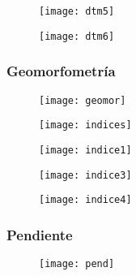 \documentclass[14pt]{beamer}
\begin{document}
\begin{frame}
  \begin{figure}
    \centering
    \texttt{[image: dtm5]}
  \end{figure}
\end{frame}
\begin{frame}
  \begin{figure}
    \centering
    \texttt{[image: dtm6]}
  \end{figure}
\end{frame}
\begin{frame}
\frametitle{Geomorfometría}
  \begin{figure}
    \centering
    \texttt{[image: geomor]}
  \end{figure}
\end{frame}
\begin{frame}
  \begin{figure}
    \centering
    \texttt{[image: indices]}
  \end{figure}
\end{frame}
\begin{frame}
  \begin{figure}
    \centering
    \texttt{[image: indice1]}
  \end{figure}
\end{frame}
\begin{frame}
  \begin{figure}
    \centering
    \texttt{[image: indice3]}
  \end{figure}
\end{frame}
\begin{frame}
  \begin{figure}
    \centering
    \texttt{[image: indice4]}
  \end{figure}
\end{frame}
\begin{frame}
\frametitle{Pendiente}
  \begin{figure}
    \centering
    \texttt{[image: pend]}
  \end{figure}
\end{frame}
\end{document}
